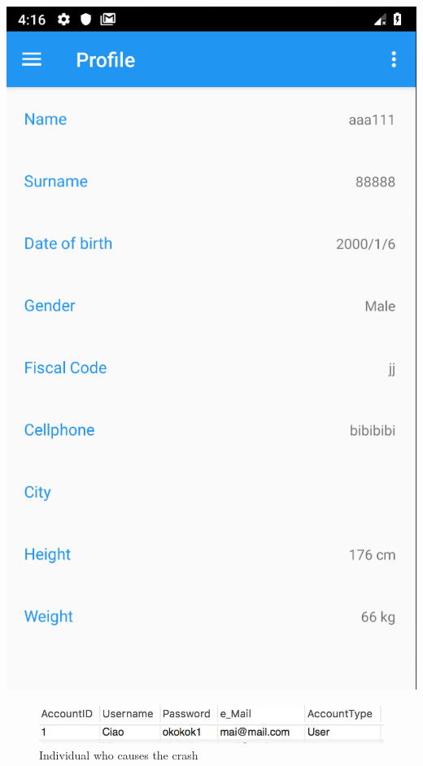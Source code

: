 \begin{center}
   \includegraphics[scale=0.7]{resources/profilebug.png}
\end{center}

\begin{figure}
\centering
\includegraphics[scale=0.8]{resources/individual_crash}
\caption{Individual who causes the crash}\label{fig:indiv_crash}
\end{figure}
